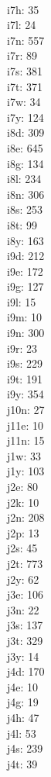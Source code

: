 \begin{multicols}{8}
  \\i7h: 35
  \\i7l: 24
  \\i7n: 557
  \\i7r: 89
  \\i7s: 381
  \\i7t: 371
  \\i7w: 34
  \\i7y: 124
  \\i8d: 309
  \\i8e: 645
  \\i8g: 134
  \\i8l: 234
  \\i8n: 306
  \\i8s: 253
  \\i8t: 99
  \\i8y: 163
  \\i9d: 212
  \\i9e: 172
  \\i9g: 127
  \\i9l: 15
  \\i9m: 10
  \\i9n: 300
  \\i9r: 23
  \\i9s: 229
  \\i9t: 191
  \\i9y: 354
  \\j10n: 27
  \\j11e: 10
  \\j11n: 15
  \\j1w: 33
  \\j1y: 103
  \\j2e: 80
  \\j2k: 10
  \\j2n: 208
  \\j2p: 13
  \\j2s: 45
  \\j2t: 773
  \\j2y: 62
  \\j3e: 106
  \\j3n: 22
  \\j3s: 137
  \\j3t: 329
  \\j3y: 14
  \\j4d: 170
  \\j4e: 10
  \\j4g: 19
  \\j4h: 47
  \\j4l: 53
  \\j4s: 239
  \\j4t: 39

\end{multicols}
